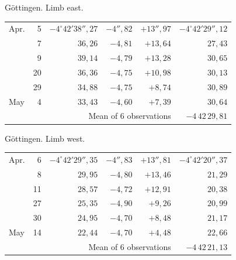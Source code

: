 \noindent\begin{minipage}[t]{.495\textwidth}\centering Göttingen. Limb east.\par\smallskip
{\scriptsize\setlength{\tabcolsep}{1pt}\renewcommand{\arraystretch}{1.2}\begin{tabular}{lr|r|r|r|r|}
Apr.&5&$-4^\circ42'38''{,}27$&$-4''{,}82$&$+13''{,}97$&$-4^\circ42'29''{,}12$\\
&7&$36{,}26$&$-4{,}81$&$+13{,}64$&$27{,}43$\\
&9&$39{,}14$&$-4{,}79$&$+13{,}28$&$30{,}65$\\
&20&$36{,}36$&$-4{,}75$&$+10{,}98$&$30{,}13$\\
&29&$34{,}88$&$-4{,}75$&$+8{,}74$&$30{,}89$\\
May&4&$33{,}43$&$-4{,}60$&$+7{,}39$&$30{,}64$\\
\cline{6-6}\multicolumn{5}{r}{Mean of 6 observations}&$-4\,42\,29{,}81$
\end{tabular}}\end{minipage}\hfill\begin{minipage}[t]{.495\textwidth}\centering Göttingen. Limb west.\par\smallskip
{\scriptsize\setlength{\tabcolsep}{1pt}\renewcommand{\arraystretch}{1.2}\begin{tabular}{lr|r|r|r|r}
Apr.&6&$-4^\circ42'29''{,}35$&$-4''{,}83$&$+13''{,}81$&$-4^\circ42'20''{,}37$\\
&8&$29{,}95$&$-4{,}80$&$+13{,}46$&$21{,}29$\\
&11&$28{,}57$&$-4{,}72$&$+12{,}91$&$20{,}38$\\
&27&$25{,}35$&$-4{,}90$&$+9{,}26$&$20{,}99$\\
&30&$24{,}95$&$-4{,}70$&$+8{,}48$&$21{,}17$\\
May&14&$22{,}44$&$-4{,}70$&$+4{,}48$&$22{,}66$\\
\cline{6-6}\multicolumn{5}{r}{Mean of 6 observations}&$-4\,42\,21{,}13$
\end{tabular}}\end{minipage}
\par\vspace{4mm}

